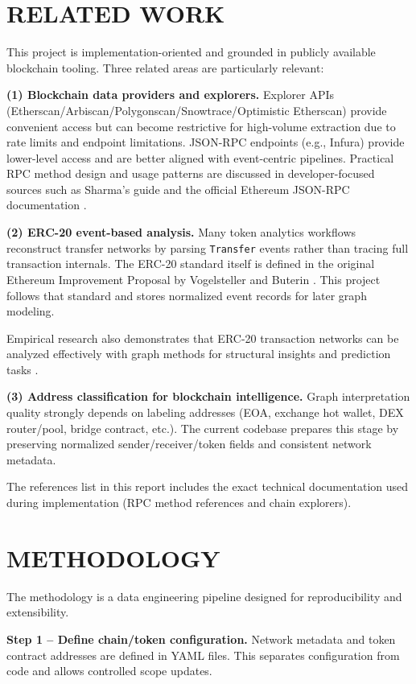 \documentclass[a4paper,12pt]{report}
\begin{document}
\chapter{RELATED WORK}
This project is implementation-oriented and grounded in publicly available blockchain tooling.
Three related areas are particularly relevant:

\textbf{(1) Blockchain data providers and explorers.}
Explorer APIs (Etherscan/Arbiscan/Polygonscan/Snowtrace/Optimistic Etherscan) provide convenient
access but can become restrictive for high-volume extraction due to rate limits and endpoint
limitations. JSON-RPC endpoints (e.g., Infura) provide lower-level access and are better aligned with
event-centric pipelines. Practical RPC method design and usage patterns are discussed in
developer-focused sources such as Sharma's guide \cite{sharma2020} and the official Ethereum
JSON-RPC documentation \cite{ethereum_jsonrpc}.

\textbf{(2) ERC-20 event-based analysis.}
Many token analytics workflows reconstruct transfer networks by parsing \texttt{Transfer} events rather
than tracing full transaction internals. The ERC-20 standard itself is defined in the original Ethereum
Improvement Proposal by Vogelsteller and Buterin \cite{erc20}. This project follows that standard and
stores normalized event records for later graph modeling.

Empirical research also demonstrates that ERC-20 transaction networks can be analyzed effectively
with graph methods for structural insights and prediction tasks \cite{somin2020}.

\textbf{(3) Address classification for blockchain intelligence.}
Graph interpretation quality strongly depends on labeling addresses (EOA, exchange hot wallet,
DEX router/pool, bridge contract, etc.). The current codebase prepares this stage by preserving
normalized sender/receiver/token fields and consistent network metadata.

The references list in this report includes the exact technical documentation used during
implementation (RPC method references and chain explorers).

\chapter{METHODOLOGY}
The methodology is a data engineering pipeline designed for reproducibility and extensibility.

\textbf{Step 1 -- Define chain/token configuration.}
Network metadata and token contract addresses are defined in YAML files. This separates
configuration from code and allows controlled scope updates.
\end{document}
